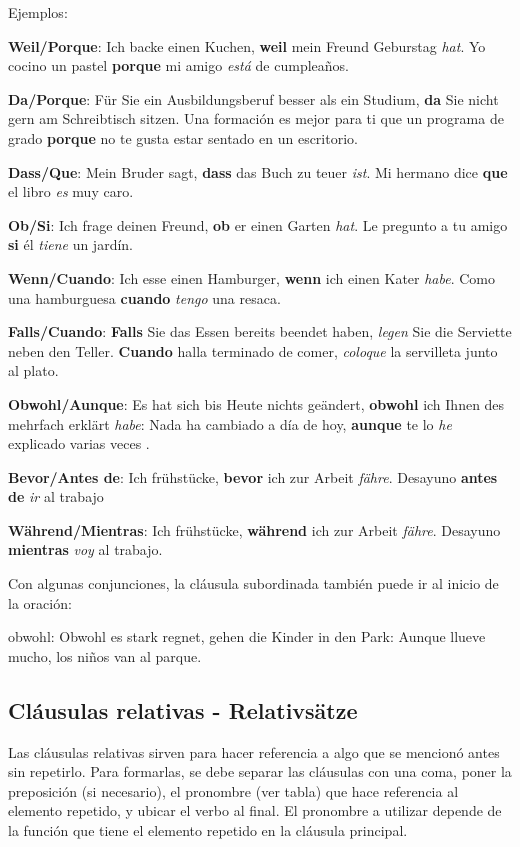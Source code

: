 Ejemplos: 
\begin{myitemize}
\item \textbf{Weil/Porque}: Ich backe einen Kuchen, \textbf{weil} mein Freund Geburstag \textit{hat}. Yo cocino un pastel \textbf{porque} mi amigo \textit{está} de cumpleaños.
\item \textbf{Da/Porque}: Für Sie ein Ausbildungsberuf besser als ein Studium, \textbf{da} Sie nicht gern am Schreibtisch sitzen. Una formación es mejor para ti que un programa de grado \textbf{porque} no te gusta estar sentado en un escritorio.
\item \textbf{Dass/Que}: Mein Bruder sagt, \textbf{dass} das Buch zu teuer \textit{ist}. Mi hermano dice \textbf{que} el libro \textit{es} muy caro.
\item \textbf{Ob/Si}: Ich frage deinen Freund, \textbf{ob} er einen Garten \textit{hat}. Le pregunto a tu amigo \textbf{si} él \textit{tiene} un jardín.
\item \textbf{Wenn/Cuando}: Ich esse einen Hamburger, \textbf{wenn} ich einen Kater \textit{habe}. Como una hamburguesa \textbf{cuando} \textit{tengo} una resaca.
\item \textbf{Falls/Cuando}: \textbf{Falls} Sie das Essen bereits beendet haben, \textit{legen} Sie die Serviette neben den Teller. \textbf{Cuando} halla terminado de comer, \textit{coloque} la servilleta junto al plato.
\item \textbf{Obwohl/Aunque}: Es hat sich bis Heute nichts geändert, \textbf{obwohl} ich Ihnen des mehrfach erklärt \textit{habe}: Nada ha cambiado a día de hoy, \textbf{aunque} te lo \textit{he} explicado varias veces .
\item \textbf{Bevor/Antes de}: Ich frühstücke, \textbf{bevor} ich zur Arbeit \textit{fähre}. Desayuno \textbf{antes de} \textit{ir} al trabajo
\item \textbf{Während/Mientras}: Ich frühstücke, \textbf{während} ich zur Arbeit \textit{fähre}. Desayuno \textbf{mientras} \textit{voy} al trabajo.
\end{myitemize}

Con algunas conjunciones, la cláusula subordinada también puede ir al inicio de la oración:
\begin{myitemize}
\item obwohl: Obwohl es stark regnet, gehen die Kinder in den Park: Aunque llueve mucho, los niños van al parque.
\end{myitemize}



\subsection{Cláusulas relativas - Relativsätze}
Las cláusulas relativas sirven para hacer referencia a algo que se mencionó antes sin repetirlo. Para formarlas, se debe separar las cláusulas con una coma, poner la preposición (si necesario), el pronombre (ver tabla) que hace referencia al elemento repetido, y ubicar el verbo al final. El pronombre a utilizar depende de la función que tiene el elemento repetido en la cláusula principal.

